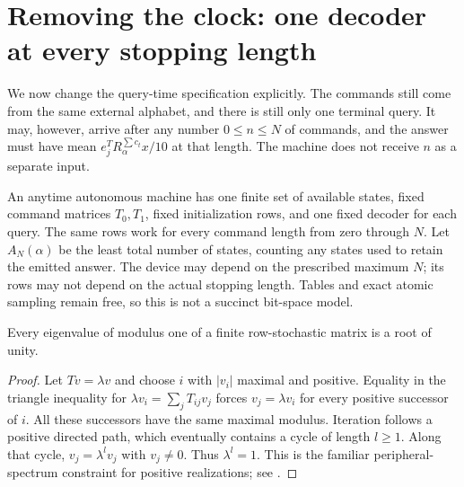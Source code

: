 \section{Removing the clock: one decoder at every stopping length}\label{sec:auto}
We now change the query-time specification explicitly. The commands still
come from the same external alphabet, and there is still only one terminal
query. It may, however, arrive after any number $0\le n\le N$ of commands,
and the answer must have mean $e_j^T R_\alpha^{\sum c_t}x/10$ at that
length. The machine does not receive $n$ as a separate input.

\begin{definition}\label{def:anytime}
An anytime autonomous machine has one finite set of available states,
fixed command matrices $T_0,T_1$, fixed initialization rows, and one
fixed decoder for each query. The same rows work for every command length
from zero through $N$. Let $A_N(\alpha)$ be the least total number of
states, counting any states used to retain the emitted answer.
The device may depend on the prescribed maximum $N$; its rows may not
depend on the actual stopping length. Tables and exact atomic sampling
remain free, so this is not a succinct bit-space model.
\end{definition}

\begin{lemma}\label{lem:peripheral}
Every eigenvalue of modulus one of a finite row-stochastic matrix is a
root of unity.
\end{lemma}
\begin{proof}
Let $Tv=\lambda v$ and choose $i$ with $|v_i|$ maximal and positive.
Equality in the triangle inequality for
$\lambda v_i=\sum_jT_{ij}v_j$ forces
$v_j=\lambda v_i$ for every positive successor of $i$.
All these successors have the same maximal modulus. Iteration follows
a positive directed path, which eventually contains a cycle of length
$l\ge1$. Along that cycle, $v_j=\lambda^l v_j$ with $v_j\ne0$.
Thus $\lambda^l=1$. This is the familiar peripheral-spectrum constraint
for positive realizations; see \cite{BF03,BF04}.
\end{proof}

